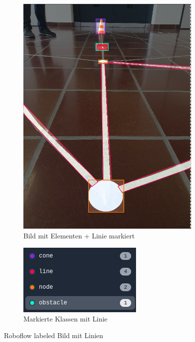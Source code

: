 \begin{figure}[H]
\begin{subfigure}{0.55\textwidth}
\includegraphics[width=0.95\linewidth]{assets/informatik-prototyp/yolo/labeled-image-lines.png} 
\caption{Bild mit Elementen + Linie markiert}
\label{fig:labeled-image-lines}
\end{subfigure}
\begin{subfigure}{0.4\textwidth}
\includegraphics[width=0.95\linewidth]{assets/informatik-prototyp/yolo/labeled-classes-lines.png} 
\caption{Markierte Klassen mit Linie}
\label{fig:line-classes-lines}
\end{subfigure}

\caption{Roboflow labeled Bild mit Linien}
\label{fig:labeling-with-lines}
\end{figure}


